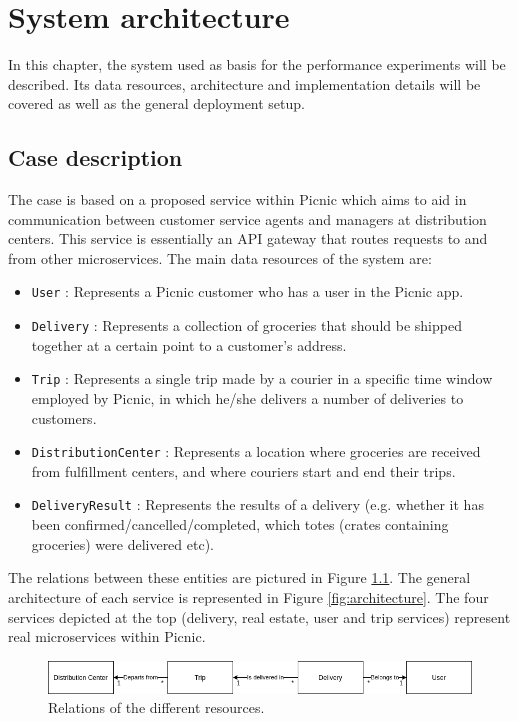 \chapter{System architecture}
In this chapter, the system used as basis for the performance experiments will be described. Its data resources, architecture and implementation details will be covered as well as the general deployment setup.

\section{Case description}
The case is based on a proposed service within Picnic which aims to aid in communication between customer service agents and managers at distribution centers. This service is essentially an API gateway that routes requests to and from other microservices. The main data resources of the system are:
\begin{itemize}
    \item \texttt{User} : Represents a Picnic customer who has a user in the Picnic app.
    \item \texttt{Delivery} : Represents a collection of groceries that should be shipped together at a certain point to a customer's address.
    \item \texttt{Trip} : Represents a single trip made by a courier in a specific time window employed by Picnic, in which he/she delivers a number of deliveries to customers.
    \item \texttt{DistributionCenter} : Represents a location where groceries are received from fulfillment centers, and where couriers start and end their trips.
    \item \texttt{DeliveryResult} : Represents the results of a delivery (e.g. whether it has been confirmed/cancelled/completed, which totes (crates containing groceries) were delivered etc).
\end{itemize}
The relations between these entities are pictured in Figure \ref{fig:relations}. The general architecture of each service is represented in Figure \ref{fig:architecture}. The four services depicted at the top (delivery, real estate, user and trip services) represent real microservices within Picnic.

\begin{figure}
    \centerline{\includegraphics[scale=0.5]{thesis_svava/images/relations.png}}
    \caption{Relations of the different resources.}
    \label{fig:relations}
\end{figure}


